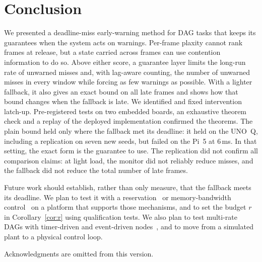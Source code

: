 \documentclass[acmsmall,screen]{acmart}
\begin{document}
\section{Conclusion}\label{sec:concl}

We presented a deadline-miss early-warning method for DAG tasks that keeps its guarantees when the system acts on warnings. Per-frame plaxity cannot rank frames at release, but a state carried across frames can use contention information to do so. Above either score, a guarantee layer limits the long-run rate of unwarned misses and, with lag-aware counting, the number of unwarned misses in every window while forcing as few warnings as possible. With a lighter fallback, it also gives an exact bound on all late frames and shows how that bound changes when the fallback is late. We identified and fixed intervention latch-up. Pre-registered tests on two embedded boards, an exhaustive theorem check and a replay of the deployed implementation confirmed the theorems. The plain bound held only where the fallback met its deadline: it held on the UNO~Q, including a replication on seven new seeds, but failed on the Pi~5 at 6\,ms. In that setting, the exact form is the guarantee to use. The replication did not confirm all comparison claims: at light load, the monitor did not reliably reduce misses, and the fallback did not reduce the total number of late frames.

Future work should establish, rather than only measure, that the fallback meets its deadline. We plan to test it with a reservation~\cite{casini2019ros2} or memory-bandwidth control~\cite{yun2013memguard} on a platform that supports those mechanisms, and to set the budget $r$ in Corollary~\ref{cor:r} using qualification tests. We also plan to test multi-rate DAGs with timer-driven and event-driven nodes~\cite{yano2023access,toba2026}, and to move from a simulated plant to a physical control loop.

\begin{acks}
Acknowledgments are omitted from this version.
\end{acks}



\end{document}
